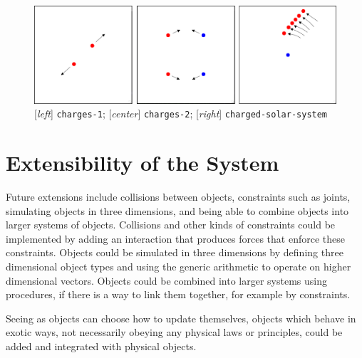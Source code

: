 \documentclass{article}
\begin{document}
\begin{figure}[h!]
  \centering
  \includegraphics[width=\textwidth,height=\textheight,keepaspectratio]
    {figs/charges.png}
  \caption{[\textit{left}] \texttt{charges-1};
    [\textit{center}] \texttt{charges-2};
    [\textit{right}] \texttt{charged-solar-system}}
  \label{figure:charges}
\end{figure}


\section{Extensibility of the System}
Future extensions include collisions between objects, constraints such as
joints, simulating objects in three dimensions, and being able to combine
objects into larger systems of objects. Collisions and other kinds of
constraints could be implemented by adding an interaction that produces forces
that enforce these constraints. Objects could be simulated in three dimensions
by defining three dimensional object types and using the generic arithmetic to
operate on higher dimensional vectors. Objects could be combined into larger
systems using procedures, if there is a way to link them together, for example
by constraints.

Seeing as objects can choose how to update themselves, objects which behave in
exotic ways, not necessarily obeying any physical laws or principles, could be
added and integrated with physical objects.
\end{document}

